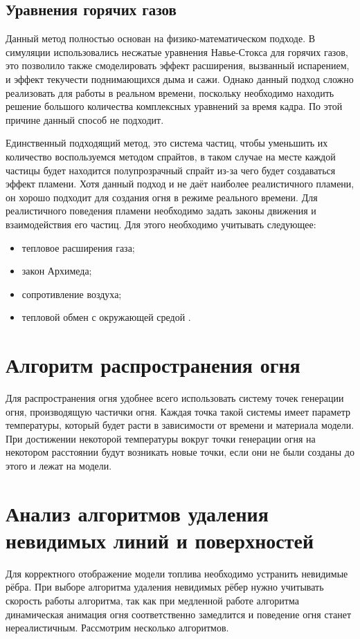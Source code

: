 \documentclass[a4paper,14pt]{report}
\begin{document}
\subsection{Уравнения горячих газов}
Данный метод полностью основан на физико-математическом подходе. В симуляции использовались несжатые уравнения Навье-Стокса для горячих газов, это позволило также смоделировать эффект расширения, вызванный испарением, и эффект текучести поднимающихся дыма и сажи. Однако данный подход сложно реализовать для работы в реальном времени, поскольку необходимо находить решение большого количества комплексных уравнений за время кадра. По этой причине данный способ не подходит.


Единственный подходящий метод, это система частиц, чтобы уменьшить их количество воспользуемся методом спрайтов, в таком случае на месте каждой частицы будет находится полупрозрачный спрайт из-за чего будет создаваться эффект пламени. Хотя данный подход и не даёт наиболее реалистичного пламени, он хорошо подходит для создания огня в режиме реального времени. Для реалистичного поведения пламени необходимо задать законы движения и взаимодействия его частиц. Для этого необходимо учитывать следующее:
\begin{itemize}
 \item тепловое расширения газа;
 \item закон Архимеда;
 \item сопротивление воздуха;
 \item тепловой обмен с окружающей средой \cite{fiz}.
\end{itemize}
\section{Алгоритм распространения огня}
Для распространения огня удобнее всего использовать систему точек генерации огня, производящую частички огня. Каждая точка такой системы имеет параметр температуры, который будет расти в зависимости от времени и материала модели.
При достижении некоторой температуры вокруг точки генерации огня на некотором расстоянии 
будут возникать новые точки, если они не были созданы до этого и лежат на модели.
 
\section{Анализ алгоритмов удаления невидимых линий и поверхностей}
Для корректного отображение модели топлива необходимо устранить невидимые рёбра. При выборе алгоритма удаления невидимых рёбер нужно учитывать скорость работы алгоритма, так как при медленной работе алгоритма динамическая анимация огня соответственно замедлится и поведение огня станет нереалистичным. Рассмотрим несколько алгоритмов.
\end{document}
